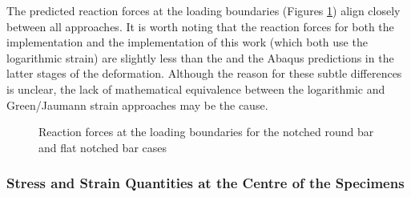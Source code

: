 \documentclass[sn-mathphys,Numbered,draft]{sn-jnl}%
\begin{document}
The predicted reaction forces at the loading boundaries (Figures \ref{fig:plastic_forces}) align closely between all approaches.
It is worth noting that the reaction forces for both the \citet{clancy_improving_2019} implementation and the implementation of this work (which both use the logarithmic strain) are slightly less than the \citet{cardiff_lagrangian_2017}  and the Abaqus predictions in the latter stages of the deformation.
Although the reason for these subtle differences is unclear, the lack of mathematical equivalence between the logarithmic and Green/Jaumann strain approaches may be the cause.
\begin{figure}[htbp]
	\centering
		\caption{Reaction forces at the loading boundaries for the notched round bar and flat notched bar cases}
	\label{fig:plastic_forces}
\end{figure}
\FloatBarrier



\subsubsection{Stress and Strain Quantities at the Centre of the Specimens}
\end{document}
